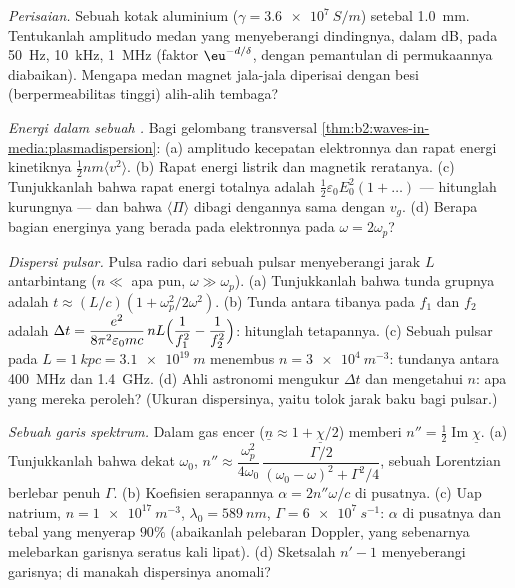 \begin{exercise}[$\star\star$]\label{exo:b2:waves-in-media:6}
\emph{Perisaian.} Sebuah kotak aluminium ($\gamma = \qty{3.6e7}{S/m}$) setebal \qty{1.0}{mm}.
Tentukanlah  amplitudo medan yang menyeberangi dindingnya, dalam dB, pada
\qty{50}{Hz}, \qty{10}{kHz}, \qty{1}{MHz} (faktor $\eu^{-d/\delta}$, dengan pemantulan di
permukaannya diabaikan). Mengapa medan magnet jala-jala diperisai
dengan besi (berpermeabilitas tinggi) alih-alih tembaga?
\end{exercise}

\begin{exercise}[$\star\star$]\label{exo:b2:waves-in-media:7}
\emph{Energi dalam sebuah .} Bagi gelombang transversal
\cref{thm:b2:waves-in-media:plasmadispersion}: (a) amplitudo kecepatan
elektronnya dan rapat energi kinetiknya $\tfrac12nm\langle v^2\rangle$. (b)
Rapat energi listrik dan magnetik reratanya. (c) Tunjukkanlah bahwa rapat energi
totalnya adalah $\tfrac12\varepsilon_0E_0^2(1 + \dots)$ --- hitunglah kurungnya ---
dan bahwa $\langle\Pi\rangle$ dibagi dengannya sama dengan $v_g$. (d) Berapa bagian
energinya yang berada pada elektronnya pada $\omega = 2\omega_p$?
\end{exercise}

\begin{exercise}[$\star\star$]\label{exo:b2:waves-in-media:8}
\emph{Dispersi pulsar.} Pulsa radio dari sebuah pulsar menyeberangi jarak
$L$  antarbintang ($n \ll$ apa pun, $\omega \gg \omega_p$). (a) Tunjukkanlah
bahwa tunda grupnya adalah $t \approx (L/c)(1 + \omega_p^2/2\omega^2)$. (b) Tunda
antara tibanya pada $f_1$ dan $f_2$ adalah $\Delta t = \dfrac{e^2}{8\pi^2
\varepsilon_0mc}\,nL\Bigl(\dfrac1{f_1^2} - \dfrac1{f_2^2}\Bigr)$: hitunglah tetapannya.
(c) Sebuah pulsar pada $L = \qty{1}{kpc} = \qty{3.1e19}{m}$ menembus $n = \qty{3e4}{m^{-3}}$:
tundanya antara \qty{400}{MHz} dan \qty{1.4}{GHz}. (d) Ahli astronomi mengukur
$\Delta t$ dan mengetahui $n$: apa yang mereka peroleh? (Ukuran dispersinya, yaitu
tolok jarak baku bagi pulsar.)
\end{exercise}

\begin{exercise}[$\star\star$]\label{exo:b2:waves-in-media:9}
\emph{Sebuah garis spektrum.} Dalam gas encer ($\underline n \approx 1 + \underline\chi/2$)
 memberi $n'' = \tfrac12\operatorname{Im}\underline\chi$. (a) Tunjukkanlah bahwa dekat
$\omega_0$, $n'' \approx \dfrac{\omega_p^2}{4\omega_0}\,\dfrac{\Gamma/2}{(\omega_0 - \omega)^2 + \Gamma^2/4}$, sebuah
Lorentzian berlebar penuh $\Gamma$. (b) Koefisien serapannya $\alpha = 2n''\omega/c$
di pusatnya. (c) Uap natrium, $n = \qty{1e17}{m^{-3}}$, $\lambda_0 = \qty{589}{nm}$,
$\Gamma = \qty{6e7}{s^{-1}}$: $\alpha$ di pusatnya dan tebal yang menyerap
$90\%$ (abaikanlah pelebaran Doppler, yang sebenarnya melebarkan garisnya
seratus kali lipat). (d) Sketsalah $n' - 1$ menyeberangi garisnya; di manakah
dispersinya anomali?
\end{exercise}

